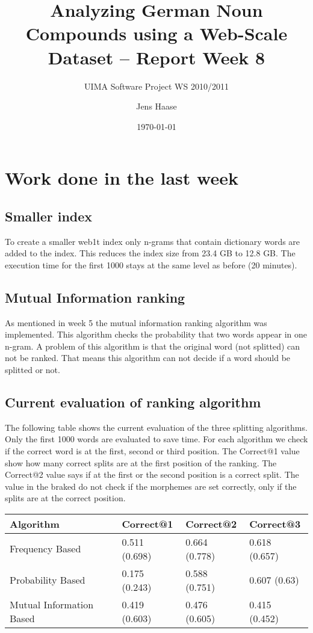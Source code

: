 \documentclass[11pt, accentcolor=tud9b, nochapname]{tudexercise}
\begin{document}
\author{Jens Haase}
\title{Analyzing German Noun Compounds using a
  Web-Scale Dataset -- Report Week 8}
\subtitle{UIMA Software Project WS 2010/2011}
\date{\today}
\maketitle

\section{Work done in the last week}

\subsection{Smaller index}
To create a smaller web1t index only n-grams that contain dictionary words are added to the index. This reduces the index size from 23.4 GB to 12.8 GB. The execution time for the first 1000 stays at the same level as before (20 minutes).

\subsection{Mutual Information ranking}
As mentioned in week 5 the mutual information ranking algorithm was implemented. This algorithm checks the probability that two words appear in one n-gram. A problem of this algorithm is that the original word (not splitted) can not be ranked. That means this algorithm can not decide if a word should be splitted or not.

\subsection{Current evaluation of ranking algorithm}
The following table shows the current evaluation of the three splitting algorithms. Only the first 1000 words are evaluated to save time. For each algorithm we check if the correct word is at the first, second or third position. The Correct@1 value show how many correct splits are at the first position of the ranking. The Correct@2 value says if at the first or the second position is a correct split. The value in the braked do not check if the morphemes are set correctly, only if the splits are at the correct position.

\begin{tabular}{l | l | l | l}
  \hline
  \textbf{Algorithm} & \textbf{Correct@1} & \textbf{Correct@2} & \textbf{Correct@3} \\ \hline
  Frequency Based & 0.511 (0.698) & 0.664 (0.778) & 0.618 (0.657) \\ \hline
  Probability Based & 0.175 (0.243) & 0.588 (0.751) & 0.607 (0.63) \\ \hline
  Mutual Information Based & 0.419 (0.603) & 0.476 (0.605) & 0.415 (0.452) \\ \hline
\end{tabular}
\end{document}
